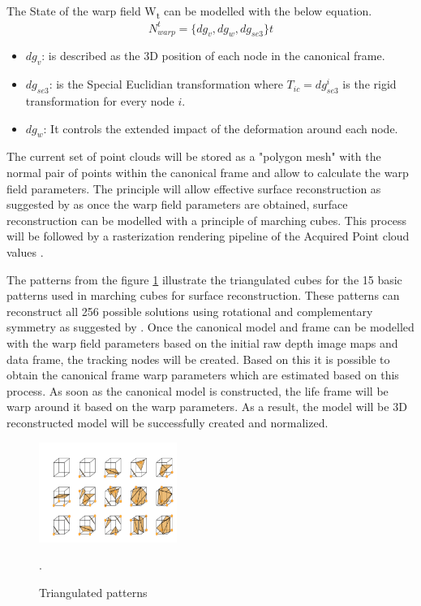 \documentclass[12pt]{report}
\begin{document}
The State of the warp field W\textsubscript{t} can be modelled with the below equation.
\[N_{warp}^t=\{dg_v,dg_w,dg_{se3}\}t\]
\begin{itemize}[label =]
  \item $dg_{v}$: is described as the 3D position of each node in the canonical frame. 
  \item $dg_{se3}$: is the Special Euclidian transformation where $T_{ic}=dg_{se3} ^ {i}$ is the rigid transformation for every node $i$.
  \item $dg_{w}$: It controls the extended impact of the deformation around each node.
\end{itemize}

The current set of point clouds will be stored as a "polygon mesh" with the normal pair of points within the canonical frame and allow to calculate the warp field parameters. 
The principle will allow effective surface reconstruction as suggested by  as once the warp field parameters are obtained, surface reconstruction can be modelled with a principle of marching cubes.
This process will be followed by a rasterization rendering pipeline of the Acquired Point cloud values .

The patterns from the figure \ref{fig:patterns} illustrate the triangulated cubes for the 15 basic patterns used in marching cubes for surface reconstruction.
These patterns can reconstruct all  256 possible solutions using rotational and complementary symmetry as suggested by .
Once the canonical model and frame can be modelled with the warp field parameters based on the initial raw depth image maps and data frame, the tracking nodes will be created.
Based on this it is possible to obtain the canonical frame warp parameters which are estimated based on this process. 
As soon as the canonical model is constructed, the life frame will be warp around it based on the warp parameters. As a result, the model will be 3D reconstructed model will be successfully created and normalized.
\begin{figure} %
    \centering
    \includegraphics[width=0.4\textwidth]{shapes.png}
    \caption{Triangulated patterns} \cite[]{fang_zhao_wen_zhang_2018}.
    \label{fig:patterns}
\end{figure}
\end{document}

